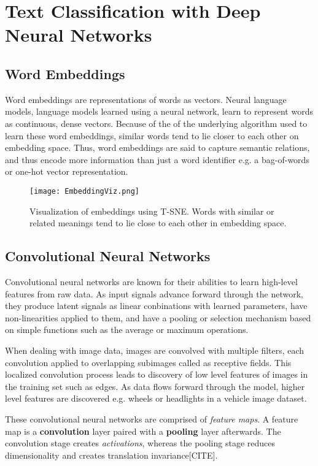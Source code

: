 
\chapter{Text Classification with Deep Neural Networks}\label{TXT-CLASS}

\section{Word Embeddings}
Word embeddings are representations of words as vectors.
Neural language models, language models learned using a neural network, learn to represent words as continuous, dense vectors.
Because of the of the underlying algorithm used to learn these word embeddings, similar words tend to lie closer to each other on embedding space.
Thus, word embeddings are said to capture semantic relations, and thus encode more information than just a word identifier e.g.
a bag-of-words or one-hot vector representation.

\begin{figure}[h]
\caption{Visualization of embeddings using T-SNE. Words with similar or related meanings
tend to lie close to each other in embedding space.}
\centering
\texttt{[image: EmbeddingViz.png]}
\end{figure}

\section{Convolutional Neural Networks}
Convolutional neural networks are known for their abilities to learn high-level features from raw data. As input signals advance
forward through the network, they produce latent signals as linear conbinations with learned parameters, have non-linearities applied
to them, and have a pooling or selection mechanism based on simple functions such as the average or maximum operations.

When dealing with image data, images are convolved with multiple filters, each convolution applied to overlapping subimages called as receptive fields.
This localized convolution process leads to discovery of low level features of images in the training set such as edges. As data
flows forward through the model, higher level features are discovered e.g. wheels or headlights in a vehicle image dataset.

These convolutional neural networks are comprised of \textit{feature maps}. A feature map is a \textbf{convolution} layer paired with a
\textbf{pooling} layer afterwards. The convolution stage creates \textit{activations}, whereas the pooling stage
reduces dimensionality and creates translation invariance[CITE].

